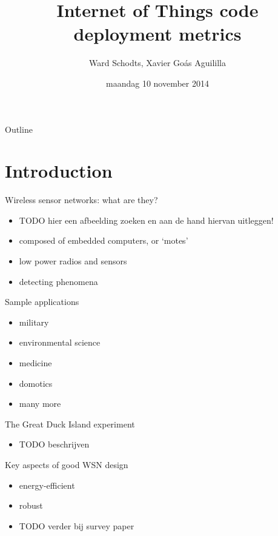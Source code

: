 \documentclass[presentation, bigger]{beamer}
\author{Ward Schodts, Xavier Goás Aguililla}
\date{maandag 10 november 2014}
\title{Internet of Things code deployment metrics}
\begin{document}
\maketitle
\begin{frame}{Outline}
\tableofcontents
\end{frame}


\section{Introduction}
\label{sec-1}
\begin{frame}[label=sec-1-1]{Wireless sensor networks: what are they?}
\begin{itemize}
\item TODO hier een afbeelding zoeken en aan de hand hiervan uitleggen!
\item composed of embedded computers, or ‘motes’
\item low power radios and sensors
\item detecting phenomena
\end{itemize}
\end{frame}

\begin{frame}[label=sec-1-2]{Sample applications}
\begin{itemize}
\item military
\item environmental science
\item medicine
\item domotics
\item many more
\end{itemize}
\end{frame}

\begin{frame}[label=sec-1-3]{The Great Duck Island experiment}
\begin{itemize}
\item TODO beschrijven
\end{itemize}
\end{frame}

\begin{frame}[label=sec-1-4]{Key aspects of good WSN design}
\begin{itemize}
\item energy-efficient
\item robust
\item TODO verder bij survey paper
\end{itemize}
\end{frame}
\end{document}
